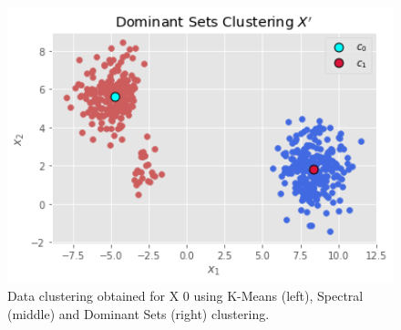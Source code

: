 \documentclass{beamer}
\begin{document}
\begin{frame}
\begin{figure}[H]
\begin{minipage}[t]{0.30\linewidth}
		\includegraphics[width=1\textwidth]{img/target/dominantXadv.png}
	\end{minipage}
	\caption{\footnotesize Data clustering obtained for X 0 using K-Means (left), Spectral (middle) and Dominant Sets (right) clustering.}
	\end{figure}
	
\end{frame}
\end{document}
